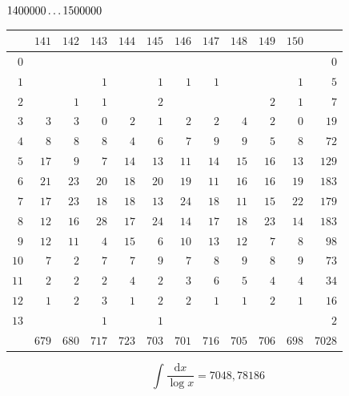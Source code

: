 \clearpage
\noindent\begin{minipage}{\linewidth}\centering
{}
\(1400000\mathinner{.\,.\,.}1500000\)\par\smallskip
\begingroup\fontsize{10.5}{11.5}\selectfont\setlength{\tabcolsep}{3.5pt}\renewcommand{\arraystretch}{1}
\begin{tabular}{r|rrrrrrrrrr|r}\hline
 & $141$ & $142$ & $143$ & $144$ & $145$ & $146$ & $147$ & $148$ & $149$ & $150$ &  \\ \hline
$0$ &  &  &  &  &  &  &  &  &  &  & $0$ \\
$1$ &  &  & $1$ &  & $1$ & $1$ & $1$ &  &  & $1$ & $5$ \\
$2$ &  & $1$ & $1$ &  & $2$ &  &  &  & $2$ & $1$ & $7$ \\
$3$ & $3$ & $3$ & $0$ & $2$ & $1$ & $2$ & $2$ & $4$ & $2$ & $0$ & $19$ \\
$4$ & $8$ & $8$ & $8$ & $4$ & $6$ & $7$ & $9$ & $9$ & $5$ & $8$ & $72$ \\
$5$ & $17$ & $9$ & $7$ & $14$ & $13$ & $11$ & $14$ & $15$ & $16$ & $13$ & $129$ \\
$6$ & $21$ & $23$ & $20$ & $18$ & $20$ & $19$ & $11$ & $16$ & $16$ & $19$ & $183$ \\
$7$ & $17$ & $23$ & $18$ & $18$ & $13$ & $24$ & $18$ & $11$ & $15$ & $22$ & $179$ \\
$8$ & $12$ & $16$ & $28$ & $17$ & $24$ & $14$ & $17$ & $18$ & $23$ & $14$ & $183$ \\
$9$ & $12$ & $11$ & $4$ & $15$ & $6$ & $10$ & $13$ & $12$ & $7$ & $8$ & $98$ \\
$10$ & $7$ & $2$ & $7$ & $7$ & $9$ & $7$ & $8$ & $9$ & $8$ & $9$ & $73$ \\
$11$ & $2$ & $2$ & $2$ & $4$ & $2$ & $3$ & $6$ & $5$ & $4$ & $4$ & $34$ \\
$12$ & $1$ & $2$ & $3$ & $1$ & $2$ & $2$ & $1$ & $1$ & $2$ & $1$ & $16$ \\
$13$ &  &  & $1$ &  & $1$ &  &  &  &  &  & $2$ \\
\hline
 & $679$ & $680$ & $717$ & $723$ & $703$ & $701$ & $716$ & $705$ & $706$ & $698$ & $7028$ \\ \hline
\end{tabular}\par\endgroup
\setlength{\abovedisplayskip}{6pt}\setlength{\belowdisplayskip}{4pt}
\[\int\frac{\mathrm{d}x}{\log x}=7048{,}78186\]
\end{minipage}\par

